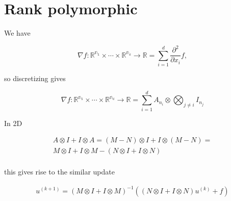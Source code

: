 \documentclass{article}
\begin{document}
\color{red}{This does not seem to work. If I delete the - and switch the 
stencils it does... Split incorrect?}

\section{Rank polymorphic}

We have

\[
\nabla f: \mathbb{R^{n_1}} \times \cdots \times \mathbb{R^{n_d}} \to \mathbb{R} 
= \sum_{i = 1}^{d} \frac{\partial^2}{\partial x_i} f,
\]

so discretizing gives

\[
\nabla f: \mathbb{R^{n_1}} \times \cdots \times \mathbb{R^{n_d}} \to \mathbb{R} 
= \sum_{i = 1}^d A_{n_i} \otimes \bigotimes_{j \neq i} I_{n_j}
\]

In 2D

\begin{align*}
    A \otimes I + I \otimes A = (M - N) \otimes I + I \otimes (M - N) = \\
    M \otimes I + I \otimes M - (N \otimes I + I \otimes N) \\
\end{align*}

this gives rise to the similar update

\begin{align*}
    u^{(k + 1)} = (M \otimes I + I \otimes M)^{-1} 
            \left((N \otimes I + I \otimes N)u^{(k)} + f \right)
\end{align*}
\end{document}
